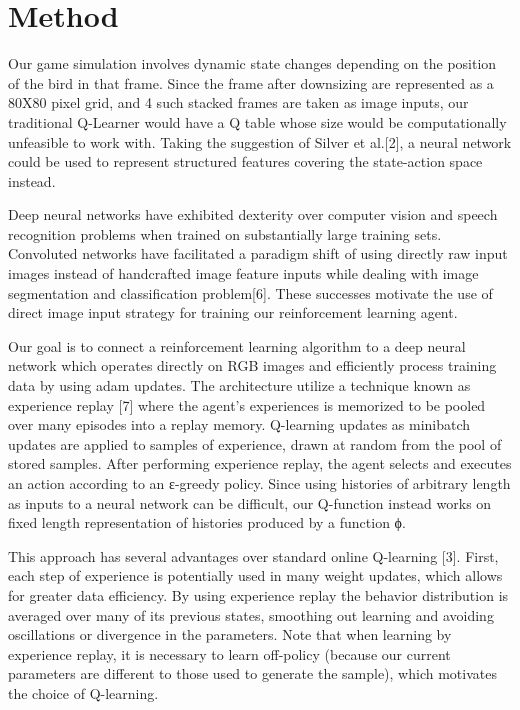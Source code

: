 \documentclass{article}
\begin{document}
\section{Method}

Our game simulation involves dynamic state changes depending on the position of the bird in that frame. Since the frame after downsizing are represented as a 80X80 pixel grid, and 4 such stacked frames are taken as image inputs, our traditional Q-Learner would have a Q table whose size would be computationally unfeasible to work with. Taking the suggestion of Silver et al.[2], a neural network could be used to represent structured features covering the state-action space instead.

Deep neural networks have exhibited dexterity over computer vision and speech recognition problems when trained on substantially large training sets. Convoluted networks have facilitated a paradigm shift of using directly raw input images instead of handcrafted image feature inputs while dealing with image segmentation and classification problem[6]. These successes motivate the use of direct image input strategy for training our reinforcement learning agent.

 Our goal is to connect a reinforcement learning algorithm to a deep neural network which operates directly on RGB images and efficiently process training data by using adam updates. The architecture utilize a technique known as experience replay [7] where the agent’s experiences  is memorized to be pooled over many episodes into a replay memory. Q-learning updates as minibatch updates are applied to samples of experience, drawn at random from the pool of stored samples. After performing experience replay, the agent selects and executes an action according to an ε-greedy policy. Since using histories of arbitrary length as inputs to a neural network can be difficult, our Q-function instead works on fixed length representation of histories produced by a function ϕ. 
 
This approach has several advantages over standard online Q-learning [3]. First, each step of experience is potentially used in many weight updates, which allows for greater data efficiency. By using experience replay the behavior distribution is averaged over many of its previous states, smoothing out learning and avoiding oscillations or divergence in the parameters. Note that when learning by experience replay, it is necessary to learn off-policy (because our current parameters are different to those used to generate the sample), which motivates the choice of Q-learning.
\end{document}
